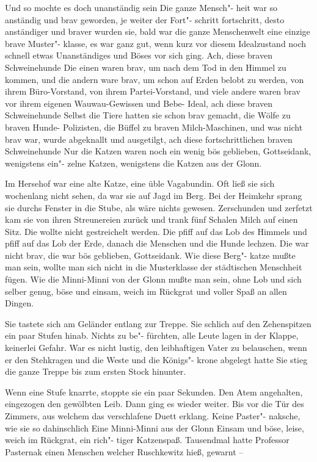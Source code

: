 Und so mochte es doch unanständig sein\ausr{} Die ganze Mensch"-%
heit war so anständig und brav geworden, je weiter der Fort"-%
schritt fortschritt, desto anständiger und braver wurden sie,
bald war die ganze Menschenwelt eine einzige brave Muster"-%
klasse, es war ganz gut, wenn kurz vor diesem Idealzustand
noch schnell etwas Unanständiges und Böses vor sich ging.
Ach, diese braven Schweinehunde\ausr{} Die einen waren brav,
um nach dem Tod in den Himmel zu kommen, und die andern
ware brav, um schon auf Erden belobt zu werden, von ihrem
Büro-Vorstand, von ihrem Partei-Vorstand, und viele andere
waren brav vor ihrem eigenen Wauwau-Gewissen und Bebe\label{lS88-1}-%
Ideal, ach diese braven Schweinehunde\ausr{} Selbst die Tiere
hatten sie schon brav gemacht, die Wölfe zu braven Hunde-%
Polizisten, die Büffel zu braven Milch-Maschinen, und was
nicht brav war, wurde abgeknallt und ausgetilgt, ach diese
fortschrittlichen braven Schweinehunde\ausr{} Nur die Katzen waren
noch ein wenig bös geblieben, Gottseidank, wenigstens ein"-%
zelne Katzen, wenigstens die Katzen aus der Glonn.

Im Hersehof war eine alte Katze, eine üble Vagabundin.
Oft ließ sie sich wochenlang nicht sehen, da war sie auf Jagd
im Berg. Bei der Heimkehr sprang sie durchs Fenster in die
Stube, als wäre nichts gewesen. Zerschunden und zerfetzt
kam sie von ihren Streunereien zurück und trank fünf Schalen
Milch auf einen Sitz. Die wollte nicht gestreichelt werden.
Die pfiff auf das Lob des Himmels und pfiff auf das Lob der
Erde, danach die Menschen und die Hunde lechzen. Die war
nicht brav, die war bös geblieben, Gottseidank. Wie diese Berg"-%
katze mußte man sein, wollte man sich nicht in die Musterklasse
der städtischen Menschheit fügen. Wie die Minni-Minni von
der Glonn mußte man sein, ohne Lob und sich selber genug,
böse und einsam, weich im Rückgrat und voller Spaß an
allen Dingen.

Sie tastete sich am Geländer entlang zur Treppe. Sie schlich
auf den Zehenspitzen ein paar Stufen hinab. Nichts zu be"-%
fürchten, alle Leute lagen in der Klappe, keinerlei Gefahr.
War es nicht lustig, den leibhaftigen Vater zu belauschen,
wenn er den Stehkragen und die Weste und die Königs"-%
krone abgelegt hatte\frag{} Sie stieg die ganze Treppe bis zum
ersten Stock hinunter.

Wenn eine Stufe knarrte, stoppte sie ein paar Sekunden.
Den Atem angehalten, eingezogen den gewölbten Leib.
Dann ging es wieder weiter. Bis vor die Tür des Zimmers,
aus welchem das verschlafene Duett erklang. Keine Paster"-%
naksche, wie sie so dahinschlich\ausr{} Eine Minni-Minni aus der
Glonn\ausr{} Einsam und böse, leise, weich im Rückgrat, ein rich"-%
tiger Katzenspaß.
\abstand{}
Tausendmal hatte Professor Pasternak einen Menschen
welcher Ruschkewitz hieß, gewarnt --
